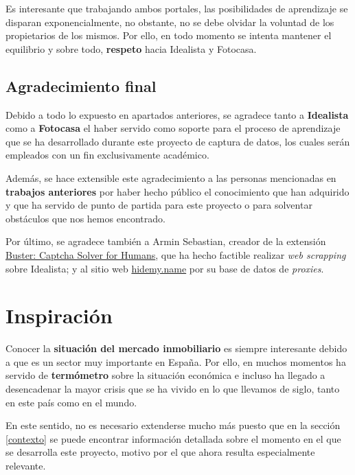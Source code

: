 \documentclass[12pt]{article}
\begin{document}
Es interesante que trabajando ambos portales, las posibilidades de aprendizaje se disparan exponencialmente, no obstante, no se debe olvidar la voluntad de los propietarios de los mismos. Por ello, en todo momento se intenta mantener el equilibrio y sobre todo, \textbf{respeto} hacia Idealista y Fotocasa. 

\vspace{-1.5em}\subsection*{Agradecimiento final}\vspace{-1.0em}

Debido a todo lo expuesto en apartados anteriores, se agradece tanto a \textbf{Idealista} como a \textbf{Fotocasa} el haber servido como soporte para el proceso de aprendizaje que se ha desarrollado durante este proyecto de captura de datos, los cuales serán empleados con un fin exclusivamente académico. 

Además, se hace extensible este agradecimiento a las personas mencionadas en \textbf{trabajos anteriores} por haber hecho público el conocimiento que han adquirido y que ha servido de punto de partida para este proyecto o para solventar obstáculos que nos hemos encontrado. 

Por último, se agradece también a Armin Sebastian, creador de la extensión \href{https://chrome.google.com/webstore/detail/buster-captcha-solver-for/mpbjkejclgfgadiemmefgebjfooflfhl}{Buster: Captcha Solver for Humans}, que ha hecho factible realizar \textit{web scrapping} sobre Idealista; y al sitio web \href{https://hidemy.name/proxy-list/}{hidemy.name} por su base de datos de \textit{proxies}.

\newpage
\vspace{-1.5em}\section{Inspiración}\vspace{-1em}

Conocer la \textbf{situación del mercado inmobiliario} es siempre interesante debido a que es un sector muy importante en España. Por ello, en muchos momentos ha servido de \textbf{termómetro} sobre la situación económica e incluso ha llegado a desencadenar la mayor crisis que se ha vivido en lo que llevamos de siglo, tanto en este país como en el mundo. 

En este sentido, no es necesario extenderse mucho más puesto que en la sección \ref{contexto} se puede encontrar información detallada sobre el momento en el que se desarrolla este proyecto, motivo por el que ahora resulta especialmente relevante.
\end{document}
